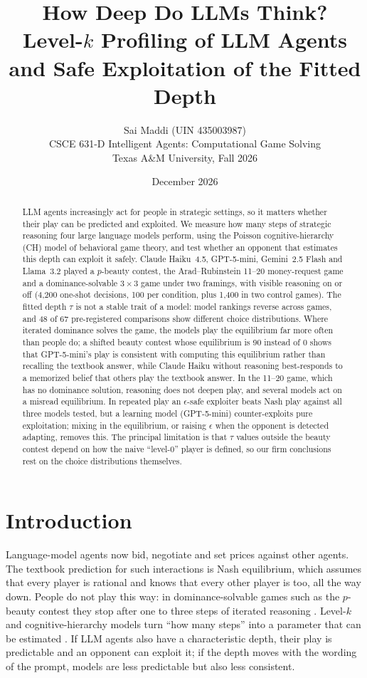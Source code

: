 \documentclass[11pt]{article}
\title{How Deep Do LLMs Think?\\[2pt]\large Level-$k$ Profiling of LLM Agents and Safe Exploitation of the Fitted Depth}
\author{Sai Maddi (UIN 435003987)\\[2pt]\normalsize CSCE 631-D Intelligent Agents: Computational Game Solving\\\normalsize Texas A\&M University, Fall 2026}
\date{December 2026}
\begin{document}
\maketitle

\begin{abstract}
LLM agents increasingly act for people in strategic settings, so it matters whether their play can be predicted and exploited. We measure how many steps of strategic reasoning four large language models perform, using the Poisson cognitive-hierarchy (CH) model of behavioral game theory, and test whether an opponent that estimates this depth can exploit it safely. Claude Haiku~4.5, GPT-5-mini, Gemini~2.5 Flash and Llama~3.2 played a $p$-beauty contest, the Arad--Rubinstein 11--20 money-request game and a dominance-solvable $3{\times}3$ game under two framings, with visible reasoning on or off (4{,}200 one-shot decisions, 100 per condition, plus 1{,}400 in two control games). The fitted depth $\tau$ is not a stable trait of a model: model rankings reverse across games, and 48 of 67 pre-registered comparisons show different choice distributions. Where iterated dominance solves the game, the models play the equilibrium far more often than people do; a shifted beauty contest whose equilibrium is 90 instead of 0 shows that GPT-5-mini's play is consistent with computing this equilibrium rather than recalling the textbook answer, while Claude Haiku without reasoning best-responds to a memorized belief that others play the textbook answer. In the 11--20 game, which has no dominance solution, reasoning does not deepen play, and several models act on a misread equilibrium. In repeated play an $\epsilon$-safe exploiter beats Nash play against all three models tested, but a learning model (GPT-5-mini) counter-exploits pure exploitation; mixing in the equilibrium, or raising $\epsilon$ when the opponent is detected adapting, removes this. The principal limitation is that $\tau$ values outside the beauty contest depend on how the naive ``level-0'' player is defined, so our firm conclusions rest on the choice distributions themselves.
\end{abstract}

\section{Introduction}
Language-model agents now bid, negotiate and set prices against other agents. The textbook prediction for such interactions is Nash equilibrium, which assumes that every player is rational and knows that every other player is too, all the way down. People do not play this way: in dominance-solvable games such as the $p$-beauty contest they stop after one to three steps of iterated reasoning \citep{nagel1995,ho1998}. Level-$k$ and cognitive-hierarchy models turn ``how many steps'' into a parameter that can be estimated \citep{stahl1995,camerer2004,crawford2013}. If LLM agents also have a characteristic depth, their play is predictable and an opponent can exploit it; if the depth moves with the wording of the prompt, models are less predictable but also less consistent.
\end{document}
